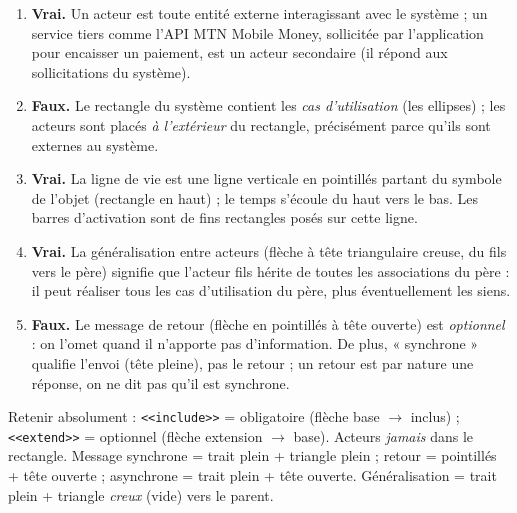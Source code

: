 \documentclass[11pt]{article}
\begin{document}
\begin{corrige}
\begin{enumerate}
\item \textbf{Vrai.} Un acteur est toute entité externe interagissant avec le système ; un service tiers comme l'API MTN Mobile Money, sollicitée par l'application pour encaisser un paiement, est un acteur secondaire (il répond aux sollicitations du système).
\item \textbf{Faux.} Le rectangle du système contient les \emph{cas d'utilisation} (les ellipses) ; les acteurs sont placés \emph{à l'extérieur} du rectangle, précisément parce qu'ils sont externes au système.
\item \textbf{Vrai.} La ligne de vie est une ligne verticale en pointillés partant du symbole de l'objet (rectangle en haut) ; le temps s'écoule du haut vers le bas. Les barres d'activation sont de fins rectangles posés sur cette ligne.
\item \textbf{Vrai.} La généralisation entre acteurs (flèche à tête triangulaire creuse, du fils vers le père) signifie que l'acteur fils hérite de toutes les associations du père : il peut réaliser tous les cas d'utilisation du père, plus éventuellement les siens.
\item \textbf{Faux.} Le message de retour (flèche en pointillés à tête ouverte) est \emph{optionnel} : on l'omet quand il n'apporte pas d'information. De plus, « synchrone » qualifie l'envoi (tête pleine), pas le retour ; un retour est par nature une réponse, on ne dit pas qu'il est synchrone.
\end{enumerate}
\end{corrige}

\begin{attention}
Retenir absolument : \texttt{<<include>>} = obligatoire (flèche base $\to$ inclus) ; \texttt{<<extend>>} = optionnel (flèche extension $\to$ base). Acteurs \emph{jamais} dans le rectangle. Message synchrone = trait plein + triangle plein ; retour = pointillés + tête ouverte ; asynchrone = trait plein + tête ouverte. Généralisation = trait plein + triangle \emph{creux} (vide) vers le parent.
\end{attention}
\end{document}
